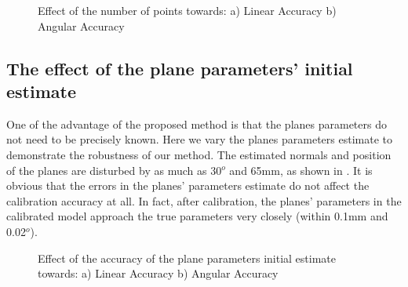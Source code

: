 \begin{figure}[h]
  \centering
  \caption{Effect of the number of points towards: a) Linear Accuracy b) Angular Accuracy} 
  \label{fig:num_of_points}
\end{figure}


\subsection{The effect of the plane parameters' initial estimate}
\label{sec:plane_params}
One of the advantage of the proposed method is that the planes parameters do not need to be precisely known. Here we vary the planes parameters estimate to demonstrate the robustness of our method. The estimated normals and position of the planes are disturbed by as much as 30$^o$ and 65mm, as shown in . It is obvious that the errors in the planes' parameters estimate do not affect the calibration accuracy at all. In fact, after calibration, the planes' parameters in the calibrated model approach the true parameters very closely (within 0.1mm and 0.02$^o$).


\begin{figure}[h]
  \centering
  \caption{Effect of the accuracy of the plane parameters initial estimate towards: a) Linear Accuracy b) Angular Accuracy} 
  \label{fig:plane_params}
\end{figure}



